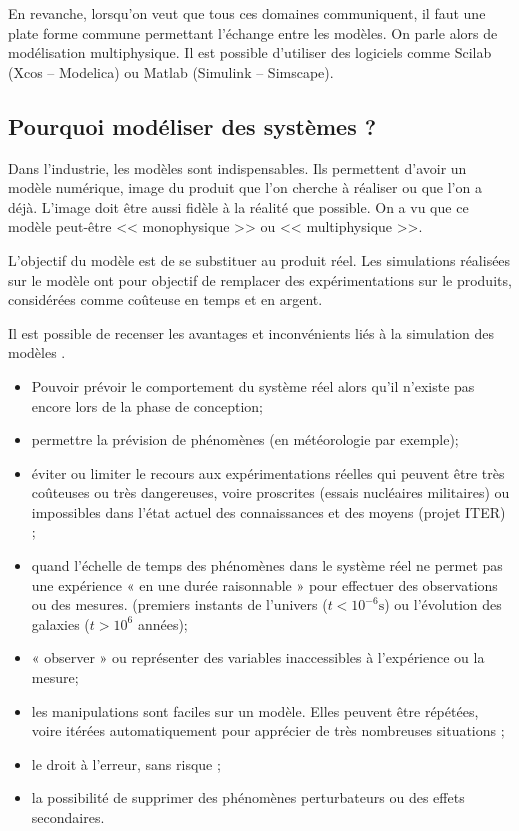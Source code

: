 En revanche, lorsqu'on veut que tous ces domaines communiquent, il faut une plate forme commune permettant l'échange entre les modèles. On parle alors de modélisation multiphysique. Il est possible d'utiliser des logiciels comme Scilab (Xcos -- Modelica) ou Matlab (Simulink -- Simscape). 



\subsection{Pourquoi modéliser des systèmes ?}
Dans l'industrie, les modèles sont indispensables. Ils permettent d'avoir un modèle numérique, image du produit que l'on cherche à réaliser ou que l'on a déjà. L'image doit être aussi fidèle à la réalité que possible. On a vu que ce modèle peut-être << monophysique >> ou << multiphysique >>. 

L'objectif du modèle est de se substituer au produit réel. Les simulations réalisées sur le modèle ont pour objectif de remplacer des expérimentations sur le produits, considérées comme coûteuse en temps et en argent. 

Il est possible de recenser les avantages et inconvénients liés à la simulation des modèles . 
\begin{itemize}[label=]
\item Pouvoir prévoir le comportement du système réel alors qu'il n’existe pas encore lors de la phase de conception;
\item permettre la prévision de phénomènes (en météorologie par exemple);
\item éviter ou limiter le recours aux expérimentations réelles qui peuvent être très
coûteuses ou très dangereuses, voire proscrites (essais nucléaires militaires) ou
impossibles dans l’état actuel des connaissances et des moyens (projet ITER) ;
\item quand l’échelle de temps des phénomènes dans le système réel ne permet pas une
expérience « en une durée raisonnable » pour effectuer des observations ou des mesures.
(premiers instants de l’univers ($t < 10^{-6} \text{s}$) ou l'évolution des galaxies
($t>10^6$ années);
\item « observer » ou représenter des variables inaccessibles à l'expérience ou la mesure;
\item les manipulations sont faciles sur un modèle. Elles peuvent être répétées, voire itérées
automatiquement pour apprécier de très nombreuses situations ;
\item le droit à l’erreur, sans risque ;
\item la possibilité de supprimer des phénomènes perturbateurs ou des effets
secondaires.
\end{itemize}

